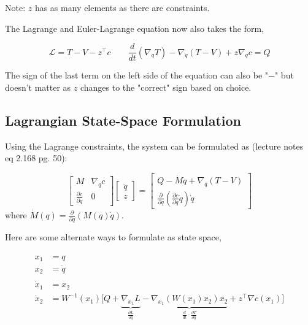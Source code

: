 Note: $z$ has as many elements as there are constraints.

The Lagrange and Euler-Lagrange equation now also takes the form,

\begin{equation}
    \mathcal{L}= T - V - z^\top c \qquad \frac{d}{dt}(\nabla_{\Dot{q}}T) - \nabla_{q}(T - V) + z\nabla_{q}c = Q 
\end{equation}

The sign of the last term on the left side of the equation can also be "$-$" but doesn't matter as $z$ changes to the "correct" sign based on choice.

\subsection{Lagrangian State-Space Formulation}

Using the Lagrange constraints, the system can be formulated as (lecture notes eq 2.168 pg. 50):

\begin{equation}
\label{eq:final_lagrange}
    \begin{bmatrix}
    M & \nabla_qc \\ \frac{\partial c}{\partial q} & 0
    \end{bmatrix}
    \begin{bmatrix}
    \ddot{q} \\ z
    \end{bmatrix}
    =
    \begin{bmatrix}
    Q-\dot{M}\dot{q}+\nabla_q (T-V) \\ 
    \frac{\partial }{\partial q}\left(\frac{\partial c}{\partial \dot{q}}\dot{q}\right)\dot{q}
    \end{bmatrix}
\end{equation}
where $\dot M(q) = \frac{\partial}{\partial q}(M(q)\dot q)$.

Here are some alternate ways to formulate as state space,

\begin{align*}
    \begin{split}
        x_1 &= q
        \\
        x_2 &= \Dot{q}
        \\
        \\
        \Dot{x}_1 &= x_2
        \\
        \Dot{x}_2 &= W^{-1}(x_1)\biggl[ Q + \underbrace{\nabla_{x_1} L}_\frac{\partial L}{\partial q} - \underbrace{\nabla_{x_1}(W(x_1)x_2)x_2}_{\frac{d}{dt}\cdot\frac{\partial T}{\partial \Dot{q}}} + z^\top \nabla c(x_1)\biggr]
    \end{split}
\end{align*}

